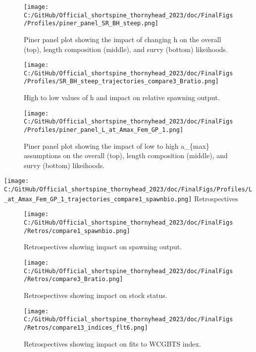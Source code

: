 \documentclass[11pt,
  english,
  letterpaper,
]{article}
\begin{document}
\begin{figure}
\centering
\texttt{[image: C:/GitHub/Official\_shortspine\_thornyhead\_2023/doc/FinalFigs/Profiles/piner\_panel\_SR\_BH\_steep.png]}
\caption{Piner panel plot showing the impact of changing h on the overall (top), length composition (middle), and survy (bottom) likeihoods.\label{fig:h_piner_prof}}
\end{figure}

\begin{figure}
\centering
\texttt{[image: C:/GitHub/Official\_shortspine\_thornyhead\_2023/doc/FinalFigs/Profiles/SR\_BH\_steep\_trajectories\_compare3\_Bratio.png]}
\caption{High to low values of h and impact on relative spawning output.\label{fig:h_spawnout}}
\end{figure}

\begin{figure}
\centering
\texttt{[image: C:/GitHub/Official\_shortspine\_thornyhead\_2023/doc/FinalFigs/Profiles/piner\_panel\_L\_at\_Amax\_Fem\_GP\_1.png]}
\caption{Piner panel plot showing the impact of low to high a\_\{max\} assumptions on the overall (top), length composition (middle), and survy (bottom) likeihoods.\label{fig:growth_prof}}
\end{figure}

\texttt{[image: C:/GitHub/Official\_shortspine\_thornyhead\_2023/doc/FinalFigs/Profiles/L\_at\_Amax\_Fem\_GP\_1\_trajectories\_compare1\_spawnbio.png]} Retrospectives

\begin{figure}
\centering
\texttt{[image: C:/GitHub/Official\_shortspine\_thornyhead\_2023/doc/FinalFigs/Retros/compare1\_spawnbio.png]}
\caption{Retrospectives showing impact on spawning output.\label{fig:retros_spawnbio}}
\end{figure}

\begin{figure}
\centering
\texttt{[image: C:/GitHub/Official\_shortspine\_thornyhead\_2023/doc/FinalFigs/Retros/compare3\_Bratio.png]}
\caption{Retrospectives showing impact on stock status.\label{fig:retros_bratio}}
\end{figure}

\begin{figure}
\centering
\texttt{[image: C:/GitHub/Official\_shortspine\_thornyhead\_2023/doc/FinalFigs/Retros/compare13\_indices\_flt6.png]}
\caption{Retrospectives showing impact on fits to WCGBTS index.\label{fig:retros_indices}}
\end{figure}
\end{document}
